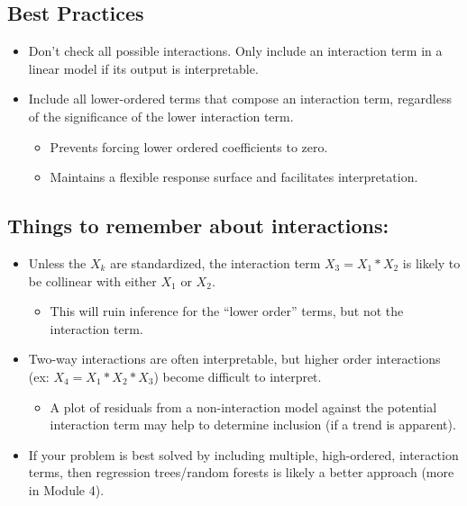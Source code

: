 \documentclass[12pt]{../notes}
\begin{document}
\subsection{Best Practices}
\begin{itemize}
\item Don't check all possible interactions. Only include an interaction term in a linear model if its output is interpretable. 
\item Include all lower-ordered terms that compose an interaction term, regardless of the significance of the lower interaction term.
\begin{itemize}
\item Prevents forcing lower ordered coefficients to zero.
\item Maintains a flexible response surface and facilitates interpretation. 
\end{itemize}
\end{itemize}

\subsection{Things to remember about interactions:}
\begin{itemize}
\item Unless the $X_k$ are standardized, the interaction term $X_3 = X_1*X_2$ is likely to be collinear with either $X_1$ or $X_2$.
\begin{itemize}
\item This will ruin inference for the ``lower order'' terms, but not the interaction term.
\end{itemize}
\item Two-way interactions are often interpretable, but higher order interactions (ex: $X_4 = X_1*X_2*X_3$) become difficult to interpret.
\begin{itemize}
\item A plot of residuals from a non-interaction model against the potential interaction term may help to determine inclusion (if a trend is apparent). 
\end{itemize}
\item If your problem is best solved by including multiple, high-ordered, interaction terms, then regression trees/random forests is likely a better approach (more in Module 4). 
\end{itemize}
\end{document}
